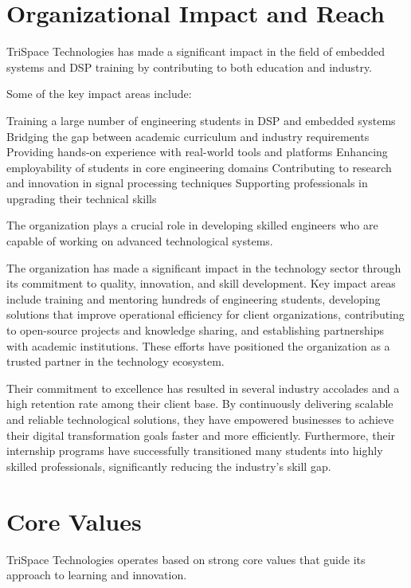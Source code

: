 \documentclass[12pt,a4paper]{report}
\begin{document}
\section{Organizational Impact and Reach}

TriSpace Technologies has made a significant impact in the field of embedded systems and DSP training by contributing to both education and industry.


Some of the key impact areas include:


Training a large number of engineering students in DSP and embedded systems Bridging the gap between academic curriculum and industry requirements Providing hands-on experience with real-world tools and platforms Enhancing employability of students in core engineering domains Contributing to research and innovation in signal processing techniques Supporting professionals in upgrading their technical skills


The organization plays a crucial role in developing skilled engineers who are capable of working on advanced technological systems.


The organization has made a significant impact in the technology sector through its commitment to quality, innovation, and skill development. Key impact areas include training and mentoring hundreds of engineering students, developing solutions that improve operational efficiency for client organizations, contributing to open-source projects and knowledge sharing, and establishing partnerships with academic institutions. These efforts have positioned the organization as a trusted partner in the technology ecosystem.


Their commitment to excellence has resulted in several industry accolades and a high retention rate among their client base. By continuously delivering scalable and reliable technological solutions, they have empowered businesses to achieve their digital transformation goals faster and more efficiently. Furthermore, their internship programs have successfully transitioned many students into highly skilled professionals, significantly reducing the industry's skill gap.


\section{Core Values}

TriSpace Technologies operates based on strong core values that guide its approach to learning and innovation.
\end{document}
